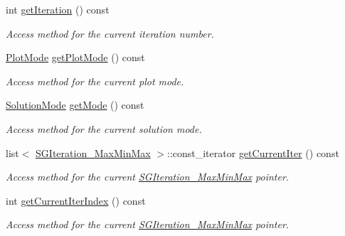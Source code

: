 \begin{DoxyCompactItemize}
int \hyperlink{classSGPlotController__V2_ae5d3ea93a15ececf05c3fb9cceba9f57}{get\+Iteration} () const
\begin{DoxyCompactList}\small\item\em Access method for the current iteration number. \end{DoxyCompactList}\item 
\mbox{\label{classSGPlotController__V2_acf16c0fb426ea62da139806175a9ca2d}} 
\hyperlink{classSGPlotController__V2_a406df03a36c19d6e12ba340b3abddb34}{Plot\+Mode} \hyperlink{classSGPlotController__V2_acf16c0fb426ea62da139806175a9ca2d}{get\+Plot\+Mode} () const
\begin{DoxyCompactList}\small\item\em Access method for the current plot mode. \end{DoxyCompactList}\item 
\mbox{\label{classSGPlotController__V2_a63040af9509c211b35b3feaa73a48aba}} 
\hyperlink{classSGPlotController__V2_a1a1b0d79a2202a7a5c7dd24ac8885677}{Solution\+Mode} \hyperlink{classSGPlotController__V2_a63040af9509c211b35b3feaa73a48aba}{get\+Mode} () const
\begin{DoxyCompactList}\small\item\em Access method for the current solution mode. \end{DoxyCompactList}\item 
\mbox{\label{classSGPlotController__V2_aa7ba918a44f28a2cac0dae929dd70fff}} 
list$<$ \hyperlink{classSGIteration__MaxMinMax}{S\+G\+Iteration\+\_\+\+Max\+Min\+Max} $>$\+::const\+\_\+iterator \hyperlink{classSGPlotController__V2_aa7ba918a44f28a2cac0dae929dd70fff}{get\+Current\+Iter} () const
\begin{DoxyCompactList}\small\item\em Access method for the current \hyperlink{classSGIteration__MaxMinMax}{S\+G\+Iteration\+\_\+\+Max\+Min\+Max} pointer. \end{DoxyCompactList}\item 
\mbox{\label{classSGPlotController__V2_ae31ded80aeff97dc2e130778433ec4e7}} 
int \hyperlink{classSGPlotController__V2_ae31ded80aeff97dc2e130778433ec4e7}{get\+Current\+Iter\+Index} () const
\begin{DoxyCompactList}\small\item\em Access method for the current \hyperlink{classSGIteration__MaxMinMax}{S\+G\+Iteration\+\_\+\+Max\+Min\+Max} pointer. \end{DoxyCompactList}\item 

\end{DoxyCompactItemize}
